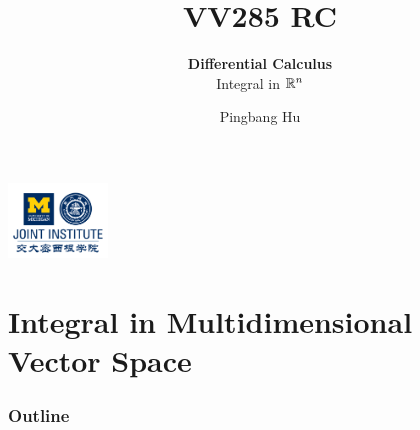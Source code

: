 \documentclass[12pt, t]{beamer}
\title{VV285 RC}
\subtitle{\textbf{Differential Calculus}\\\large Integral in $\mathbb{R}^n$}
\institute[UM-SJTU JI]{Univerity of Michigan-Shanghai Jiao Tong University Joint Institute}
\author{Pingbang Hu}
\begin{document}
\begin{frame}
    \titlepage
    \begin{center}
        \includegraphics[height=2cm]{Figures/logo/logo2.png}
    \end{center}
\end{frame}

\section{Integral in Multidimensional Vector Space}
\begin{frame}
    \frametitle{Outline}
    \begin{spacing}{1.2}
        \tableofcontents[currentsubsection,hideothersubsections,sectionstyle=hide]
    \end{spacing}
\end{frame}
\end{document}

